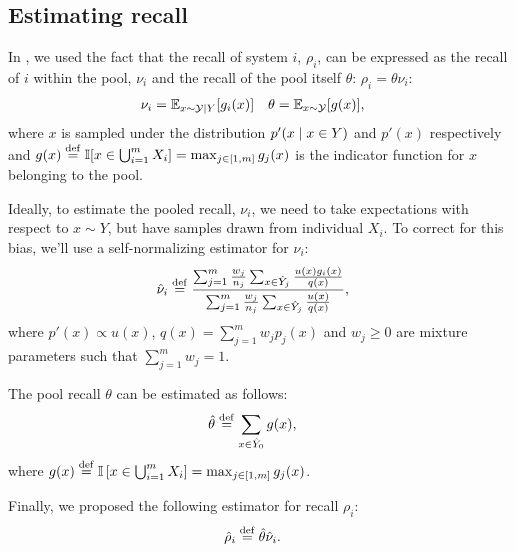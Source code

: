 \subsection{Estimating recall}

In , we used the fact that the recall of system $i$, $\rho_i$, can be expressed as the recall of $i$ within the pool, $\nu_i$ and the recall of the pool itself $\theta$: $\rho_i = \theta \nu_i$:  
\begin{align*}
  \nu_i &= \mathbb{E}_{x \sim \mathcal{Y} \mid Y}[g_i(x)] &
  \theta &= \mathbb{E}_{x \sim \mathcal{Y}}[g(x)],
\end{align*}
where $x$ is sampled under the distribution $p'(x \mid x \in Y)$ and $p'(x)$ respectively and
  $g(x) \stackrel{\rm def}{=} \mathbb{I}[x \in \bigcup_{i=1}^m X_i] = \max_{j \in [1,m]} g_j(x)$ is the indicator function for $x$ belonging to the pool.

Ideally, to estimate the pooled recall, $\nu_i$, we need to take expectations with respect to $x \sim Y$, but have samples drawn from individual $X_i$.
To correct for this bias, we'll use a self-normalizing estimator for $\nu_i$:
\begin{align*}
  {\hat{\nu}}_i &\stackrel{\rm def}{=} \frac{\sum_{j=1}^m \frac{w_j}{n_j} \sum_{x \in {\hat{Y}}_j} \frac{u(x) g_i(x)}{q(x)}}{\sum_{j=1}^m \frac{w_j}{n_j} \sum_{x \in {\hat{Y}}_j} \frac{u(x)}{q(x)}},
\end{align*}
where $p'(x) \propto u(x)$, $q(x) = \sum_{j=1}^m w_{j} p_j(x)$ and $w_{j} \ge 0$ are mixture parameters such that $\sum_{j=1}^m w_{j} = 1$.

The pool recall $\theta$ can be estimated as follows:
\begin{align*}
  {\hat{\theta}} &\stackrel{\rm def}{=} \sum_{x \in {\hat{Y}}_0} g(x),
\end{align*}
where $g(x) \stackrel{\rm def}{=} \mathbb{I}\left[ x \in \bigcup_{i=1}^m X_i \right] = \max_{j \in [1,m]} g_j(x)$.

Finally, we proposed the following estimator for recall $\rho_i$:
\begin{align*}
  {\hat{\rho}}_i &\stackrel{\rm def}{=} {\hat{\theta}}{\hat{\nu}}_i.
\end{align*}

